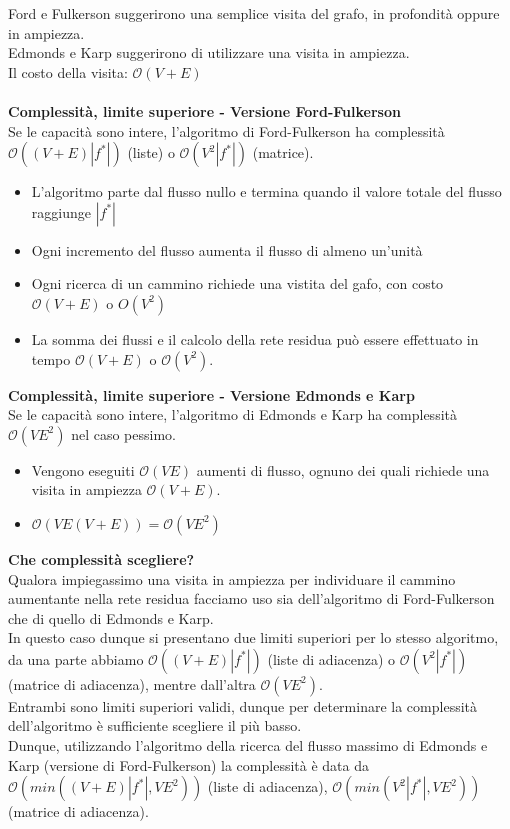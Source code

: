 \documentclass[../cheatSheetAlgoritmi.tex]{subfiles}
\begin{document}
Ford e Fulkerson suggerirono una semplice visita del grafo, in profondità oppure in ampiezza. \\Edmonds e Karp suggerirono di utilizzare una visita in ampiezza. \\
Il costo della visita: $\mathcal{O}(V + E)$ \\\\
\textbf{Complessità, limite superiore - Versione Ford-Fulkerson} \\
Se le capacità sono intere, l'algoritmo di Ford-Fulkerson ha complessità $\mathcal{O}((V + E)|f^{*}|)$ (liste) o $\mathcal{O}(V^2 |f^*|)$ (matrice).
\begin{itemize}
	\item L'algoritmo parte dal flusso nullo e termina quando il valore totale del flusso raggiunge $|f^*|$
	\item Ogni incremento del flusso aumenta il flusso di almeno un'unità
	\item Ogni ricerca di un cammino richiede una vistita del gafo, con costo $\mathcal{O}(V + E)$ o $O(V^2)$
	\item La somma dei flussi e il calcolo della rete residua può essere effettuato in tempo $\mathcal{O}(V + E) $ o $\mathcal{O}(V^2)$.
\end{itemize}
\textbf{Complessità, limite superiore - Versione Edmonds e Karp} \\
Se le capacità sono intere, l'algoritmo di Edmonds e Karp ha complessità $\mathcal{O}(VE^2)$ nel caso pessimo. 
\begin{itemize}
	\item Vengono eseguiti $\mathcal{O}(VE)$ aumenti di flusso, ognuno dei quali richiede una visita in ampiezza $\mathcal{O}(V + E)$.
	\item $\mathcal{O}(VE(V + E)) = \mathcal{O}(VE^2)$
\end{itemize}
\textbf{Che complessità scegliere?}\\
Qualora impiegassimo una visita in ampiezza per individuare il cammino aumentante nella rete residua facciamo uso sia dell'algoritmo di Ford-Fulkerson che di quello di Edmonds e Karp. \\
In questo caso dunque si presentano due limiti superiori per lo stesso algoritmo, da una parte abbiamo $\mathcal{O}((V + E)|f^{*}|)$ (liste di adiacenza) o $\mathcal{O}(V^2 |f^*|)$ (matrice di adiacenza), mentre dall'altra  $\mathcal{O}(VE^2)$.\\
Entrambi sono limiti superiori validi, dunque per determinare la complessità dell'algoritmo è sufficiente scegliere il più basso. \\
Dunque, utilizzando l'algoritmo della ricerca del flusso massimo di Edmonds e Karp (versione di Ford-Fulkerson) la complessità è data da $\mathcal{O}(min((V + E)|f^{*}|, VE^2))$ (liste di adiacenza), $\mathcal{O}(min(V^2|f^{*}|, VE^2))$ (matrice di adiacenza).
\end{document}
